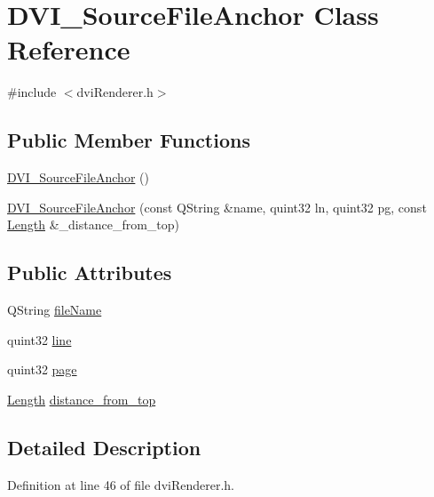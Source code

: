 \hypertarget{classDVI__SourceFileAnchor}{\section{D\+V\+I\+\_\+\+Source\+File\+Anchor Class Reference}
\label{classDVI__SourceFileAnchor}
}


{\ttfamily \#include $<$dvi\+Renderer.\+h$>$}

\subsection*{Public Member Functions}
\begin{DoxyCompactItemize}
\item 
\hyperlink{classDVI__SourceFileAnchor_aa9237313b96e9f0c09eadf5542814bd5}{D\+V\+I\+\_\+\+Source\+File\+Anchor} ()
\item 
\hyperlink{classDVI__SourceFileAnchor_a5e3485ec2d3f32f04c30433310a13f57}{D\+V\+I\+\_\+\+Source\+File\+Anchor} (const Q\+String \&name, quint32 ln, quint32 pg, const \hyperlink{classLength}{Length} \&\+\_\+distance\+\_\+from\+\_\+top)
\end{DoxyCompactItemize}
\subsection*{Public Attributes}
\begin{DoxyCompactItemize}
\item 
Q\+String \hyperlink{classDVI__SourceFileAnchor_a9e8fbd464c09df77dbbaee5018efe85c}{file\+Name}
\item 
quint32 \hyperlink{classDVI__SourceFileAnchor_ada7ea524ce6a9fa2a4e40b9b17ce3234}{line}
\item 
quint32 \hyperlink{classDVI__SourceFileAnchor_a0e6c40abda8f0a8c4076bc0dee5c6691}{page}
\item 
\hyperlink{classLength}{Length} \hyperlink{classDVI__SourceFileAnchor_af842eeb8d0e00ff713d57bfadd7fe1cf}{distance\+\_\+from\+\_\+top}
\end{DoxyCompactItemize}


\subsection{Detailed Description}


Definition at line 46 of file dvi\+Renderer.\+h.



